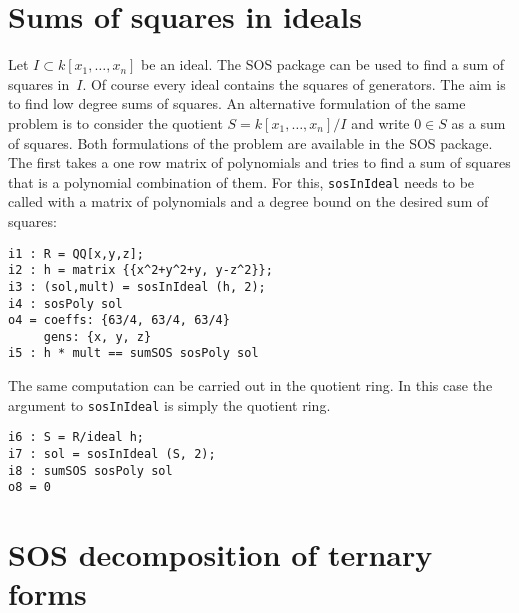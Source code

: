 \documentclass[11pt]{amsart}
\theoremstyle{plain}%
\theoremstyle{definition}
\theoremstyle{remark}
\newcommand{\SOS}{\textsc{SOS}\xspace}
\begin{document}
\section{Sums of squares in ideals}
Let $I \subset k[x_{1},\dots,x_{n}]$ be an ideal.  The \SOS package can be used to find a sum of squares in~$I$.
Of course every ideal contains the squares of generators.
The aim is to find low degree sums of squares.
An alternative formulation of the same problem is to consider the quotient $S = k[x_{1},\dots,x_{n}]/I$ and write $0\in S$ as a sum of squares.
Both formulations of the problem are available in the \SOS package.
The first takes a one row matrix of polynomials and tries to find a sum of squares that is a polynomial combination of them.
For this, \verb|sosInIdeal| needs to be called with a matrix of polynomials and a degree bound on the desired sum of squares:
{\small
\begin{verbatim}
i1 : R = QQ[x,y,z];
i2 : h = matrix {{x^2+y^2+y, y-z^2}};
i3 : (sol,mult) = sosInIdeal (h, 2);
i4 : sosPoly sol
o4 = coeffs: {63/4, 63/4, 63/4}
     gens: {x, y, z}
i5 : h * mult == sumSOS sosPoly sol
\end{verbatim}
}
The same computation can be carried out in the quotient ring.
In this case the argument to \verb|sosInIdeal| is simply the quotient ring.
{\small
\begin{verbatim}
i6 : S = R/ideal h;
i7 : sol = sosInIdeal (S, 2);
i8 : sumSOS sosPoly sol
o8 = 0
\end{verbatim}
}

\section{SOS decomposition of ternary forms}
\end{document}
